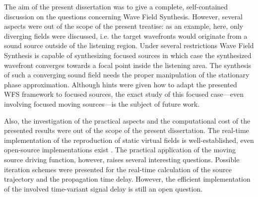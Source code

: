 \vspace{3mm}
The aim of the present dissertation was to give a complete, self-contained discussion on the questions concerning Wave Field Synthesis.
However, several aspects were out of the scope of the present treatise: as an example, here, only diverging fields were discussed, i.e. the target wavefronts would originate from a sound source outside of the listening region.
Under several restrictions Wave Field Synthesis is capable of synthesizing focused sources in which case the synthesized wavefront converges towards a focal point inside the listening area.
The synthesis of such a converging sound field needs the proper manipulation of the stationary phase approximation.
Although hints were given how to adapt the presented WFS framework to focused sources, the exact study of this focused case---even involving focused moving sources---is the subject of future work.

Also, the investigation of the practical aspects and the computational cost of the presented results were out of the scope of the present dissertation.
The real-time implementation of the reproduction of static virtual fields is well-established, even open-source implementations exist \cite{ahrens2008the}.
The practical application of the moving source driving function, however, raises several interesting questions.
Possible iteration schemes were presented for the real-time calculation of the source trajectory and the propagation time delay.
However, the efficient implementation of the involved time-variant signal delay is still an open question.